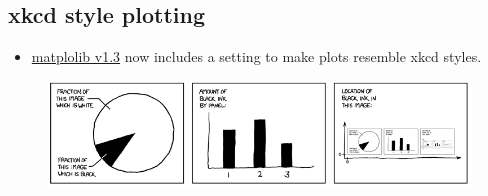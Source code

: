 \documentclass{article}
\begin{document}
    \subsection{xkcd style plotting}

\begin{itemize}
\itemsep1pt\parskip0pt
\item
  \href{http://matplotlib.org/xkcd/examples/showcase/xkcd.html}{matplolib
  v1.3} now includes a setting to make plots resemble xkcd styles.
\end{itemize}

\begin{figure}[htbp]
\centering
\includegraphics{static/img/xkcd.png}
\end{figure}
\end{document}
